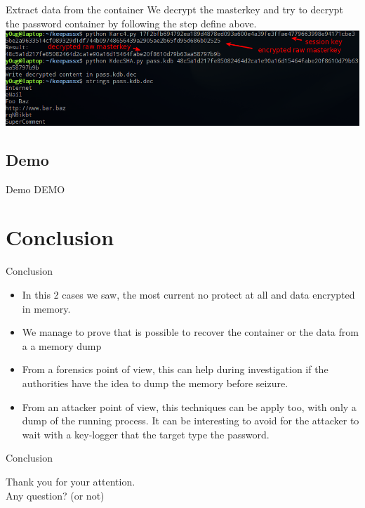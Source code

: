 \documentclass[compress]{beamer}
\begin{document}
\begin{frame}{Extract data from the container}
  We decrypt the masterkey and try to decrypt the password container by following the step define above.\\
  \vspace{0.2in}
  \includegraphics[scale=0.35]{img/keypass_recover_data}\\
\end{frame}

\subsection{Demo}
\begin{frame}{Demo}
  DEMO
\end{frame}

\section{Conclusion}
\begin{frame}{Conclusion}
  \begin{itemize}
    \item In this 2 cases we saw, the most current no protect at all and data encrypted in memory.
    \item We manage to prove that is possible to recover the container or the data from a a memory dump
    \item From a forensics point of view, this can help during investigation if the authorities have the idea to dump the memory before seizure.
    \item From an attacker point of view, this techniques can be apply too, with only a dump of the running process. It can be interesting to avoid for the attacker to wait with a key-logger that the target type the password.
  \end{itemize}
\end{frame}

\begin{frame}{Conclusion}
  \begin{center}
  Thank you for your attention.\\
  \vspace{0.2in}
  Any question? (or not)
\end{center}
\end{frame}
\end{document}
